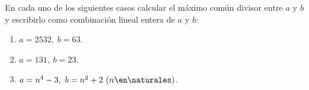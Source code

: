 \begin{enunciado}{\ejercicio}
  En cada uno de los siguientes casos calcular el máximo común divisor entre $a$ y $b$ y escribirlo como combinación lineal entera de $a$ y $b$:
  \begin{enumerate}[label=\roman*)]
    \item $a = 2532,\ b = 63$.
    \item $a = 131,\ b = 23$.
    \item $a = n^4 - 3,\ b = n^2 + 2\ (n \en \naturales)$.
  \end{enumerate}
\end{enunciado}

\hacer

